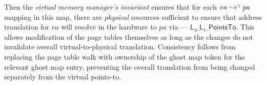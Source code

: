   
  Then the \emph{virtual memory manager's invariant} ensures that for each $va\hookrightarrow^{\gamma}pa$ mapping
  in this map, there are \emph{physical} resources sufficient to ensure that address translation for $va$
  will resolve in the hardware to $pa$ via --- $\textsf{L}_{4}\_\textsf{L}_{1}\_\textsf{PointsTo}$.
  This allows modification of the page tables themselves as long as the changes do not invalidate overall virtual-to-physical
  translation.
  Consistency follows from replacing the page table walk with ownership of the ghost map token for the relevant ghost map
  entry, preventing the overall translation from being changed separately from the virtual points-to.


